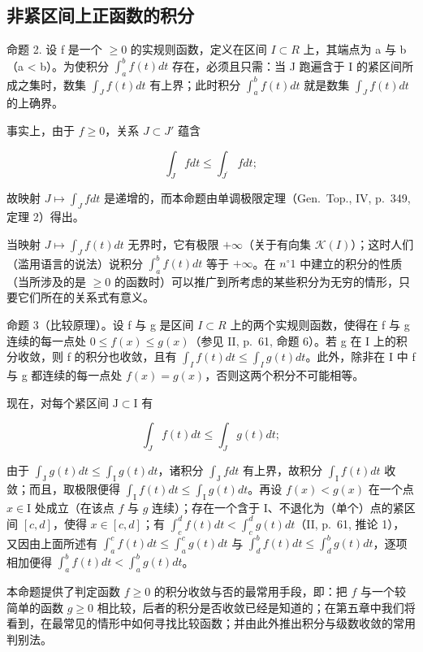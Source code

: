 \subsection{非紧区间上正函数的积分}

命题 2. 设 f 是一个 \(\geqslant 0\) 的实规则函数，定义在区间 \(I \subset R\) 上，其端点为 a 与 b（a \textless{} b）。为使积分 \(\int_{a}^{b} f(t) dt\) 存在，必须且只需：当 J 跑遍含于 I 的紧区间所成之集时，数集 \(\int_{J} f(t) dt\) 有上界；此时积分 \(\int_{a}^{b} f(t) dt\) 就是数集 \(\int_{J} f(t) dt\) 的上确界。

事实上，由于 \(f \geqslant 0\)，关系 \(J \subset J'\) 蕴含

\[
\int_ {J} f d t \leqslant \int_ {J ^ {\prime}} f d t;
\]

故映射 \(J \mapsto \int_{J} f dt\) 是递增的，而本命题由单调极限定理（Gen.~Top., IV, p.~349, 定理 2）得出。

当映射 \(J \mapsto \int_{J} f(t) dt\) 无界时，它有极限 \(+\infty\)（关于有向集 \(\mathcal{K}(I)\)）；这时人们（滥用语言的说法）说积分 \(\int_{a}^{b} f(t) dt\) 等于 \(+\infty\)。在 \(n^{\circ} 1\) 中建立的积分的性质（当所涉及的是 \(\geqslant 0\) 的函数时）可以推广到所考虑的某些积分为无穷的情形，只要它们所在的关系式有意义。

命题 3（比较原理）。设 f 与 g 是区间 \(I \subset R\) 上的两个实规则函数，使得在 f 与 g 连续的每一点处 \(0 \leqslant f(x) \leqslant g(x)\)（参见 II, p.~61, 命题 6）。若 g 在 I 上的积分收敛，则 f 的积分也收敛，且有 \(\int_{I} f(t) dt \leqslant \int_{I} g(t) dt\)。此外，除非在 I 中 f 与 g 都连续的每一点处 \(f(x) = g(x)\)，否则这两个积分不可能相等。

现在，对每个紧区间 \(\mathrm{J} \subset \mathrm{I}\) 有

\[
\int_ {J} f (t) d t \leqslant \int_ {J} g (t) d t;
\]

由于 \(\int_{\mathrm{J}} g(t) dt \leqslant \int_{\mathrm{I}} g(t) dt\)，诸积分 \(\int_{\mathrm{J}} f dt\) 有上界，故积分 \(\int_{\mathrm{I}} f(t) dt\) 收敛；而且，取极限便得 \(\int_{\mathrm{I}} f(t) dt \leqslant \int_{\mathrm{I}} g(t) dt\)。再设 \(f(x) < g(x)\) 在一个点 \(x \in \mathrm{I}\) 处成立（在该点 \(f\) 与 \(g\) 连续）；存在一个含于 I、不退化为（单个）点的紧区间 \([c, d]\)，使得 \(x \in [c, d]\)；有 \(\int_{c}^{d} f(t) dt < \int_{c}^{d} g(t) dt\)（II, p.~61, 推论 1），又因由上面所述有 \(\int_{a}^{c} f(t) dt \leqslant \int_{a}^{c} g(t) dt\) 与 \(\int_{d}^{b} f(t) dt \leqslant \int_{d}^{b} g(t) dt\)，逐项相加便得 \(\int_{a}^{b} f(t) dt < \int_{a}^{b} g(t) dt\)。

本命题提供了判定函数 \(f \geqslant 0\) 的积分收敛与否的最常用手段，即：把 \(f\) 与一个较简单的函数 \(g \geqslant 0\) 相比较，后者的积分是否收敛已经是知道的；在第五章中我们将看到，在最常见的情形中如何寻找比较函数；并由此外推出积分与级数收敛的常用判别法。

